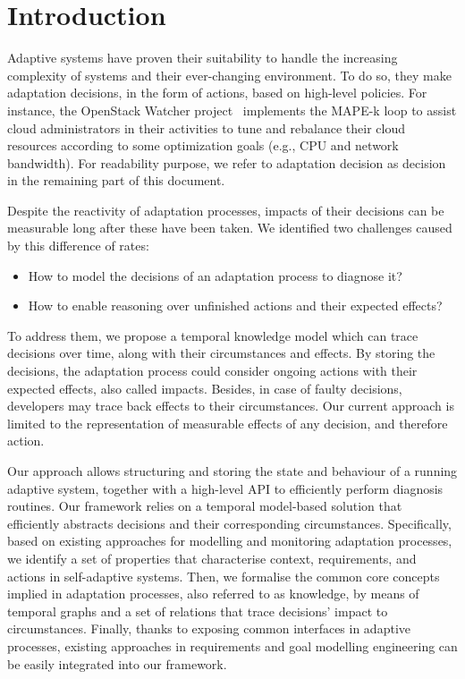 \section{Introduction}

Adaptive systems have proven their suitability to handle the increasing complexity of systems and their ever-changing environment.
To do so, they make adaptation decisions, in the form of actions, based on high-level policies. 
For instance, the OpenStack Watcher project~\cite{OpenStack:Watcher:Wiki} implements the MAPE-k loop to assist cloud administrators in their activities to tune and rebalance their cloud resources according to some optimization goals (e.g., CPU and network bandwidth). 
For readability purpose, we refer to adaptation decision as decision in the remaining part of this document.

Despite the reactivity of adaptation processes, impacts of their decisions can be measurable long after these have been taken.
We identified two challenges caused by this difference of rates:
\begin{itemize}
	\item How to model the decisions of an adaptation process to diagnose it?
	\item How to enable reasoning over unfinished actions and their expected effects?
\end{itemize}

To address them, we propose a temporal knowledge \gls{model} which can trace decisions over time, along with their circumstances and effects.
By storing the \glspl{decision}, the adaptation process could consider ongoing \glspl{action} with their expected effects, also called impacts.
Besides, in case of faulty decisions, developers may trace back effects to their \glspl{circumstance}.
Our current approach is limited to the representation of measurable effects of any decision, and therefore action.

Our approach allows structuring and storing the state and behaviour of a running adaptive system, together with a high-level API to efficiently perform diagnosis routines. 
Our framework relies on a temporal model-based solution that efficiently abstracts decisions and their corresponding circumstances.
Specifically, based on existing approaches for modelling and monitoring adaptation processes, we identify a set of properties that characterise context, requirements, and actions in self-adaptive systems.    
Then, we formalise the common core concepts implied in adaptation processes, also referred to as knowledge, by means of temporal graphs and a set of relations that trace decisions' impact to circumstances.
Finally, thanks to exposing common interfaces in adaptive processes, existing approaches in requirements and goal modelling engineering can be easily integrated into our framework. 

